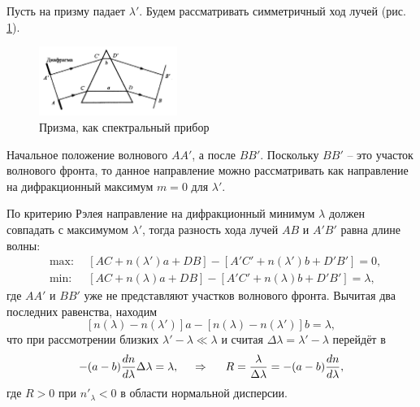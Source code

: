 

Пусть на призму падает $\lambda'$. Будем рассматривать симметричный ход лучей (рис. \ref{fig:pr}). 
\begin{figure}[h]
    \centering
    \includegraphics[width=0.4\textwidth]{figures/49_1.png}
    \caption{Призма, как спектральный прибор}
    \label{fig:pr}
\end{figure}
Начальное положение волнового $AA'$, а после $BB'$. Поскольку $BB'$ -- это участок волнового фронта, то данное направление можно рассматривать как направление на дифракционный максимум $m=0$ для $\lambda'$. 

По критерию Рэлея направление на дифракционный минимум $\lambda$ должен совпадать с максимумом $\lambda'$, тогда разность хода лучей $AB$ и $A' B'$ равна длине волны:
\begin{align*}
    &\text{max:} \ \ 
    &\left[AC + n(\lambda') a + DB\right] - \left[
        A'C' + n(\lambda') b + D' B'
    \right] = 0, \\
    &\text{min:} \ \ 
    &\left[AC + n(\lambda) a + DB\right] - 
    \left[
        A'C' + n(\lambda) b + D' B'
    \right] = \lambda,
\end{align*}
где $AA'$ и $BB'$ уже не представляют участков волнового фронта.  Вычитая два последних равенства, находим
\begin{equation*}
    \left[n(\lambda)-n(\lambda')\right]a - \left[n(\lambda)-n(\lambda')\right]b = \lambda,
\end{equation*}
что при рассмотрении близких $\lambda' - \lambda \ll\lambda$ и считая $\Delta \lambda = \lambda'-\lambda$ перейдёт в 
\begin{equation*}
    -(a-b) \frac{d n}{d \lambda} \Delta \lambda = \lambda,
    \hspace{0.5cm} \Rightarrow \hspace{0.5cm}
    R = \frac{\lambda}{\Delta \lambda} = - (a-b) \frac{d n}{d \lambda},
\end{equation*}
где $R > 0$ при $n'_\lambda < 0$ в области нормальной дисперсии.